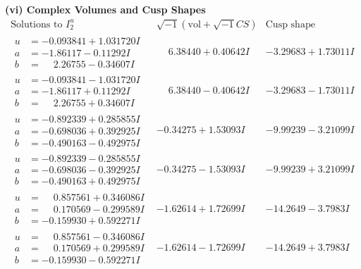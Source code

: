 \documentclass[1p]{elsarticle_modified}
\theoremstyle{definition}
\newcommand{\I}{\sqrt{-1}}
\begin{document}
\newpage\flushleft \textbf{(vi) Complex Volumes and Cusp Shapes}
$$\begin{array}{c|c|c}  
\text{Solutions to }I^u_{2}& \I (\text{vol} + \sqrt{-1}CS) & \text{Cusp shape}\\
 \hline 
\begin{aligned}
u &= -0.093841 + 1.031720 I \\
a &= -1.86117 - 0.11292 I \\
b &= \phantom{-}2.26755 - 0.34607 I\end{aligned}
 & \phantom{-}6.38440 + 0.40642 I & -3.29683 + 1.73011 I \\ \hline\begin{aligned}
u &= -0.093841 - 1.031720 I \\
a &= -1.86117 + 0.11292 I \\
b &= \phantom{-}2.26755 + 0.34607 I\end{aligned}
 & \phantom{-}6.38440 - 0.40642 I & -3.29683 - 1.73011 I \\ \hline\begin{aligned}
u &= -0.892339 + 0.285855 I \\
a &= -0.698036 + 0.392925 I \\
b &= -0.490163 - 0.492975 I\end{aligned}
 & -0.34275 + 1.53093 I & -9.99239 - 3.21099 I \\ \hline\begin{aligned}
u &= -0.892339 - 0.285855 I \\
a &= -0.698036 - 0.392925 I \\
b &= -0.490163 + 0.492975 I\end{aligned}
 & -0.34275 - 1.53093 I & -9.99239 + 3.21099 I \\ \hline\begin{aligned}
u &= \phantom{-}0.857561 + 0.346086 I \\
a &= \phantom{-}0.170569 - 0.299589 I \\
b &= -0.159930 + 0.592271 I\end{aligned}
 & -1.62614 + 1.72699 I & -14.2649 - 3.7983 I \\ \hline\begin{aligned}
u &= \phantom{-}0.857561 - 0.346086 I \\
a &= \phantom{-}0.170569 + 0.299589 I \\
b &= -0.159930 - 0.592271 I\end{aligned}
 & -1.62614 - 1.72699 I & -14.2649 + 3.7983 I \\ \hline\begin{aligned}

\end{aligned}
\end{array}$$
\end{document}
